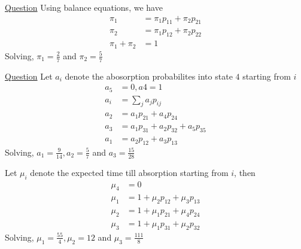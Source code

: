 \documentclass[../probability-notes.tex]{subfiles}
\begin{document}
\begin{enumerate}
        \hypertarget{a_steadymarkov}{\item} \hyperlink{q_steadymarkov}{Question}\newline
        Using balance equations, we have
        \begin{align*}
            \pi_{1} &= \pi_{1}p_{11} + \pi_{2}p_{21}\\
            \pi_{2} &= \pi_{1}p_{12} + \pi_{2}p_{22}\\
            \pi_{1} + \pi_{2} &= 1
        \end{align*}
        Solving, $\pi_{1} = \frac{2}{7}$ and $\pi_{2} = \frac{5}{7}$

        \hypertarget{a_absorbmarkov}{\item} \hyperlink{q_absorbmarkov}{Question}\newline
        Let $a_{i}$ denote the abosorption probabilites into state $4$ starting from $i$
        \begin{align*}
            a_{5} &= 0, a{4} = 1 \\
            a_{i} &= \sum_{j} a_{j}p_{ij}\\
            a_{2} &= a_{1}p_{21} + a_{4}p_{24}\\
            a_{3} &= a_{1}p_{31} + a_{2}p_{32} + a_{5}p_{35}\\
            a_{1} &= a_{2}p_{12} + a_{3}p_{13}
        \end{align*}
        Solving, $a_{1} = \frac{9}{14}, a_{2} = \frac{5}{7}$ and $a_{3} = \frac{15}{28}$ \newline
        
        Let $\mu_{i}$ denote the expected time till absorption starting from $i$, then
        \begin{align*}
            \mu_{4} &= 0 \\
            \mu_{1} &= 1 + \mu_{2}p_{12} + \mu_{3}p_{13} \\
            \mu_{2} &= 1 + \mu_{1}p_{21} + \mu_{4}p_{24} \\
            \mu_{3} &= 1 + \mu_{1}p_{31} + \mu_{2}p_{32}
        \end{align*}
        Solving, $\mu_{1} = \frac{55}{4}, \mu_{2} = 12$ and $\mu_{3} = \frac{111}{8}$



\end{enumerate}
\end{document}
